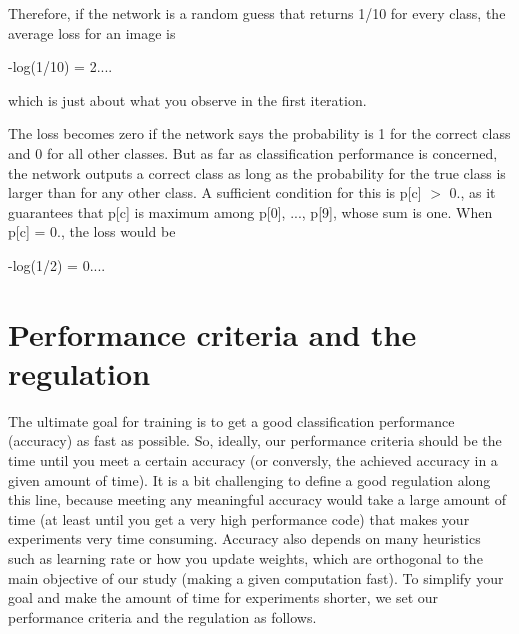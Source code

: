 Therefore, if the network is a random guess that returns 1/10 for every class, the average loss for an image is

-\/log(1/10) = 2....

which is just about what you observe in the first iteration.

The loss becomes zero if the network says the probability is 1 for the correct class and 0 for all other classes. But as far as classification performance is concerned, the network outputs a correct class as long as the probability for the true class is larger than for any other class. A sufficient condition for this is p\mbox{[}c\mbox{]} $>$ 0., as it guarantees that p\mbox{[}c\mbox{]} is maximum among p\mbox{[}0\mbox{]}, ..., p\mbox{[}9\mbox{]}, whose sum is one. When p\mbox{[}c\mbox{]} = 0., the loss would be

-\/log(1/2) = 0....

\section*{Performance criteria and the regulation }

The ultimate goal for training is to get a good classification performance (accuracy) as fast as possible. So, ideally, our performance criteria should be the time until you meet a certain accuracy (or conversly, the achieved accuracy in a given amount of time). It is a bit challenging to define a good regulation along this line, because meeting any meaningful accuracy would take a large amount of time (at least until you get a very high performance code) that makes your experiments very time consuming. Accuracy also depends on many heuristics such as learning rate or how you update weights, which are orthogonal to the main objective of our study (making a given computation fast). To simplify your goal and make the amount of time for experiments shorter, we set our performance criteria and the regulation as follows.


